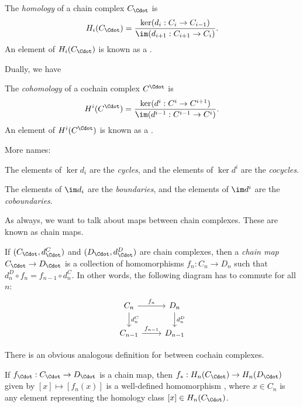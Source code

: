 \documentclass[a4paper]{article}
\theoremstyle{definition}
\begin{document}
\begin{defi}[Homology]
  The \emph{homology} of a chain complex $C_{\Cdot}$ is
  \[
    H_i(C_{\Cdot}) = \frac{\ker (d_i: C_i \to C_{i - 1})}{\im (d_{i + 1}: C_{i + 1} \to C_i)}.
  \]
  An element of $H_i(C_{\Cdot})$ is known as a .
\end{defi}

Dually, we have
\begin{defi}[Cohomology]
  The \emph{cohomology} of a cochain complex $C^{\Cdot}$ is
  \[
    H^i(C^{\Cdot}) = \frac{\ker (d^i: C^i \to C^{i + 1})}{\im (d^{i - 1}: C^{i - 1} \to C^i)}.
  \]
  An element of $H^i(C^{\Cdot})$ is known as a .
\end{defi}

More names:
\begin{defi}
  The elements of $\ker d_i$ are the \emph{cycles}, and the elements of $\ker d^i$ are the \emph{cocycles}.
\end{defi}

\begin{defi}
  The elements of $\im d_i$ are the \emph{boundaries}, and the elements of $\im d^i$ are the \emph{coboundaries}.
\end{defi}

As always, we want to talk about maps between chain complexes. These are known as chain maps.
\begin{defi}
  If $(C_{\Cdot}, d_{\Cdot}^C)$ and $(D_{\Cdot}, d_{\Cdot}^D)$ are chain complexes, then a \emph{chain map} $C_{\Cdot} \to D_{\Cdot}$ is a collection of homomorphisms $f_n: C_n \to D_n$ such that $d_n^D \circ f_n = f_{n - 1} \circ d_n^C$. In other words, the following diagram has to commute for all $n$:
  \[
    \begin{tikzcd}
      C_n \ar[r, "f_n"] \ar[d, "d_n^C"] & D_n \ar[d, "d_n^D"]\\
      C_{n - 1} \ar[r, "f_{n - 1}"] & D_{n - 1}
    \end{tikzcd}
  \]
\end{defi}
There is an obvious analogous definition for  between cochain complexes.

\begin{lemma}
  If $f_{\Cdot}: C_{\Cdot} \to D_{\Cdot}$ is a chain map, then $f_*: H_n(C_{\Cdot}) \to H_n(D_{\Cdot})$ given by $[x] \mapsto [f_n(x)]$ is a well-defined homomorphism , where $x \in C_n$ is any element representing the homology class $[x] \in H_n(C_{\Cdot})$.
\end{lemma}
\end{document}
